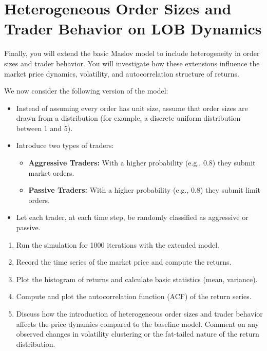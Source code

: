\section*{Heterogeneous Order Sizes and Trader Behavior on LOB Dynamics}
Finally, you will extend the basic Maslov model to include heterogeneity in order sizes and trader behavior. You will investigate how these extensions influence the market price dynamics, volatility, and autocorrelation structure of returns.

We now consider the following version of the model:
\begin{itemize}
    \item Instead of assuming every order has unit size, assume that order sizes are drawn from a distribution (for example, a discrete uniform distribution between 1 and 5).
    \item Introduce two types of traders:
        \begin{itemize}
            \item \textbf{Aggressive Traders:} With a higher probability (e.g., 0.8) they submit market orders.
            \item \textbf{Passive Traders:} With a higher probability (e.g., 0.8) they submit limit orders.
        \end{itemize}
        \item Let each trader, at each time step, be randomly classified as aggressive or passive.
    \end{itemize}
    \begin{enumerate}
        \item Run the simulation for 1000 iterations with the extended model.
        \item Record the time series of the market price and compute the returns.
        \item Plot the histogram of returns and calculate basic statistics (mean, variance).
        \item Compute and plot the autocorrelation function (ACF) of the return series.
        \item Discuss how the introduction of heterogeneous order sizes and trader behavior affects the price dynamics compared to the baseline model. Comment on any observed changes in volatility clustering or the fat-tailed nature of the return distribution.
    \end{enumerate}
